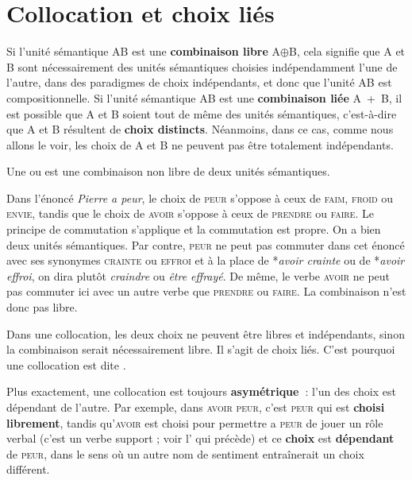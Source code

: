 \section{Collocation et choix liés}\label{sec:2.3.10}

Si l’unité sémantique AB est une \textbf{combinaison libre} A${\oplus}$B, cela signifie que A et B sont nécessairement des unités sémantiques choisies indépendamment l’une de l’autre, dans des paradigmes de choix indépendants, et donc que l’unité AB est compositionnelle. Si l’unité sémantique AB est une \textbf{combinaison liée} A~+~B, il est possible que A et B soient tout de même des unités sémantiques, c’est-à-dire que A et B résultent de \textbf{choix distincts}. Néanmoins, dans ce cas, comme nous allons le voir, les choix de A et B ne peuvent pas être totalement indépendants.

\begin{styleLivreImportant}
Une  ou  est une combinaison non libre de deux unités sémantiques.
\end{styleLivreImportant}

Dans l’énoncé \textit{Pierre a peur}, le choix de \textsc{peur} s’oppose à ceux de \textsc{faim,} \textsc{froid} ou \textsc{envie}, tandis que le choix de \textsc{avoir} s’oppose à ceux de \textsc{prendre} ou \textsc{faire}. Le principe de commutation s’applique et la commutation est propre. On a bien deux unités sémantiques. Par contre, \textsc{peur} ne peut pas commuter dans cet énoncé avec ses synonymes \textsc{crainte} ou \textsc{effroi} et à la place de *\textit{avoir crainte} ou de *\textit{avoir effroi}, on dira plutôt \textit{craindre} ou \textit{être effrayé}. De même, le verbe \textsc{avoir} ne peut pas commuter ici avec un autre verbe que \textsc{prendre} ou \textsc{faire}. La combinaison n’est donc pas libre.

\begin{styleLivreImportant}
Dans une collocation, les deux choix ne peuvent être libres et indépendants, sinon la combinaison serait nécessairement libre. Il s’agit de choix liés. C’est pourquoi une collocation est dite .
\end{styleLivreImportant}

Plus exactement, une collocation est toujours \textbf{asymétrique~}: l’un des choix est dépendant de l’autre. Par exemple, dans \textsc{avoir} \textsc{peur}, c’est \textsc{peur} qui est \textbf{choisi librement}, tandis qu’\textsc{avoir} est choisi pour permettre a \textsc{peur} de jouer un rôle verbal (c’est un verbe support ; voir l’ qui précède) et ce \textbf{choix} est \textbf{dépendant} de \textsc{peur}, dans le sens où un autre nom de sentiment entraînerait un choix différent.

